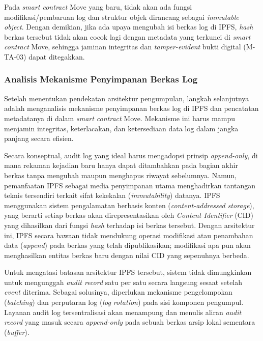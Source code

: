 Pada \textit{smart contract} Move yang baru, tidak akan ada fungsi modifikasi/pembaruan log dan struktur objek dirancang sebagai \textit{immutable object}. Dengan demikian, jika ada upaya mengubah isi berkas log di IPFS, \textit{hash} berkas tersebut tidak akan cocok lagi dengan metadata yang terkunci di \textit{smart contract} Move, sehingga jaminan integritas dan \textit{tamper-evident} bukti digital (M-TA-03) dapat ditegakkan.

\subsubsection{Analisis Mekanisme Penyimpanan Berkas Log}
\label{subsubsec:analisis-penyimpanan-berkas}

Setelah menentukan pendekatan arsitektur pengumpulan, langkah selanjutnya adalah menganalisis mekanisme penyimpanan berkas log di IPFS dan pencatatan metadatanya di dalam \textit{smart contract} Move. Mekanisme ini harus mampu menjamin integritas, keterlacakan, dan ketersediaan data log dalam jangka panjang secara efisien.

Secara konseptual, audit log yang ideal harus mengadopsi prinsip \textit{append-only}, di mana rekaman kejadian baru hanya dapat ditambahkan pada bagian akhir berkas tanpa mengubah maupun menghapus riwayat sebelumnya. Namun, pemanfaatan IPFS sebagai media penyimpanan utama menghadirkan tantangan teknis tersendiri terkait sifat kekekalan (\textit{immutability}) datanya. IPFS menggunakan sistem pengalamatan berbasis konten (\textit{content-addressed storage}), yang berarti setiap berkas akan direpresentasikan oleh \textit{Content Identifier} (CID) yang dihasilkan dari fungsi \textit{hash} terhadap isi berkas tersebut. Dengan arsitektur ini, IPFS secara bawaan tidak mendukung operasi modifikasi atau penambahan data (\textit{append}) pada berkas yang telah dipublikasikan; modifikasi apa pun akan menghasilkan entitas berkas baru dengan nilai CID yang sepenuhnya berbeda.

Untuk mengatasi batasan arsitektur IPFS tersebut, sistem tidak dimungkinkan untuk mengunggah \textit{audit record} satu per satu secara langsung sesaat setelah \textit{event} diterima. Sebagai solusinya, diperlukan mekanisme pengelompokan (\textit{batching}) dan perputaran log (\textit{log rotation}) pada sisi komponen pengumpul. Layanan audit log tersentralisasi akan menampung dan menulis aliran \textit{audit record} yang masuk secara \textit{append-only} pada sebuah berkas arsip lokal sementara (\textit{buffer}).

